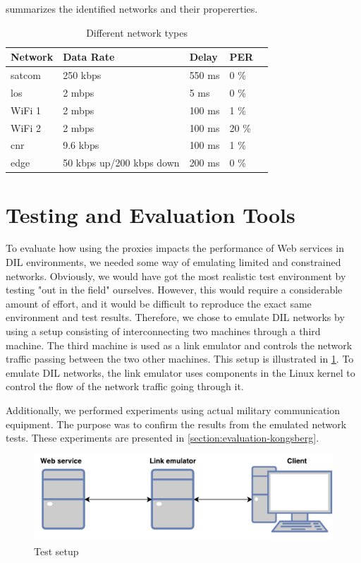  summarizes the identified networks and their
propererties.

\begin{table}[h]
\begin{tabular}{| l | l | l | l | l |}
\hline
  \textbf{Network} & \textbf{Data Rate} & \textbf{Delay} & \textbf{PER} \\ \hline
  \gls{satcom} & 250 kbps & 550 ms & 0 \% \\ \hline
  \gls{los} & 2 mbps & 5 ms & 0 \% \\ \hline
  WiFi 1 & 2 mbps & 100 ms & 1 \% \\ \hline
  WiFi 2 & 2 mbps & 100 ms & 20 \% \\ \hline
  \gls{cnr} & 9.6 kbps & 100 ms & 1 \% \\ \hline
  \gls{edge} & 50 kbps up/200 kbps down & 200 ms & 0 \% \\ \hline
\end{tabular}
\caption{Different network types}
\label{table-network-types}
\end{table}


\section{Testing and Evaluation Tools}

To evaluate how using the proxies impacts the performance of Web services in DIL
environments, we needed some way of emulating limited and constrained networks.
Obviously, we would have got the most realistic test environment by testing "out
in the field" ourselves. However, this would require a considerable amount of
effort, and it would be difficult to reproduce the exact same environment and
test results. Therefore, we chose to emulate DIL networks by using a setup
consisting of interconnecting two machines through a third machine. The third
machine is used as a link emulator and controls the network traffic passing
between the two other machines. This setup is illustrated in
\cref{figure-testing-environment-simple}. To emulate DIL networks, the link
emulator uses components in the Linux kernel to control the flow of the network
traffic going through it.

Additionally, we performed experiments using actual military communication
equipment. The purpose was to confirm the results from the emulated network
tests. These experiments are presented in \cref{section:evaluation-kongsberg}.

\begin{figure}[h]
\includegraphics[width=\textwidth]{images/testing_environment_simple.pdf}
\caption{Test setup}
\label{figure-testing-environment-simple}
\end{figure}

